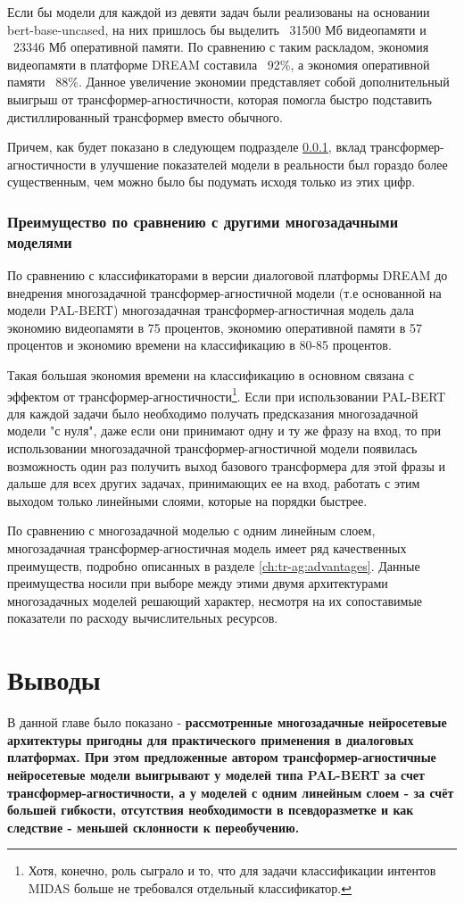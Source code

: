 Если бы модели для каждой из девяти задач были реализованы на основании bert-base-uncased, на них пришлось бы выделить ~31500 Мб видеопамяти и ~23346 Мб оперативной памяти. По сравнению с таким раскладом, экономия видеопамяти в платформе {DREAM} составила ~92\%, а экономия оперативной памяти ~88\%. Данное увеличение экономии представляет собой дополнительный выигрыш от трансформер-агностичности, которая помогла быстро подставить дистиллированный трансформер вместо обычного.

Причем, как будет показано в следующем подразделе \ref{economy_real}, вклад трансформер-агностичности в улучшение показателей модели в реальности был гораздо более существенным, чем можно было бы подумать исходя только из этих цифр. 

\subsubsection{Преимущество по сравнению с другими многозадачными моделями}
\label{economy_real} 
По сравнению с классификаторами в версии диалоговой платформы {DREAM} до внедрения многозадачной трансформер-агностичной модели (т.е основанной на модели PAL-BERT) многозадачная трансформер-агностичная модель дала экономию видеопамяти в 75 процентов, экономию оперативной памяти в 57 процентов и экономию времени на классификацию в 80-85 процентов.
 
Такая большая экономия времени на классификацию в основном связана с эффектом от трансформер-агностичности\footnote{Хотя, конечно, роль сыграло и то, что для задачи классификации интентов MIDAS больше не требовался отдельный классификатор.}. Если при использовании PAL-BERT для каждой задачи было необходимо получать предсказания многозадачной модели "с нуля", даже если они принимают одну и ту же фразу на вход, то при использовании многозадачной трансформер-агностичной модели появилась возможность один раз получить выход базового трансформера для этой фразы и дальше для всех других задачах, принимающих ее на вход, работать с этим выходом только линейными слоями, которые на порядки быстрее. 

По сравнению с многозадачной моделью с одним линейным слоем, многозадачная трансформер-агностичная модель имеет ряд качественных преимуществ, подробно описанных в разделе \ref{ch:tr-ag:advantages}. Данные преимущества носили при выборе между этими двумя архитектурами многозадачных моделей решающий характер, несмотря на их сопоставимые показатели по расходу вычислительных ресурсов.

\section{Выводы}
В данной главе было показано - \textbf{рассмотренные многозадачные нейросетевые архитектуры пригодны для практического применения в диалоговых платформах. При этом предложенные автором трансформер-агностичные нейросетевые модели выигрывают у моделей типа PAL-BERT за счет трансформер-агностичности, а у моделей с одним линейным слоем - за счёт большей гибкости, отсутствия необходимости в псевдоразметке и как следствие - меньшей склонности к переобучению.}




